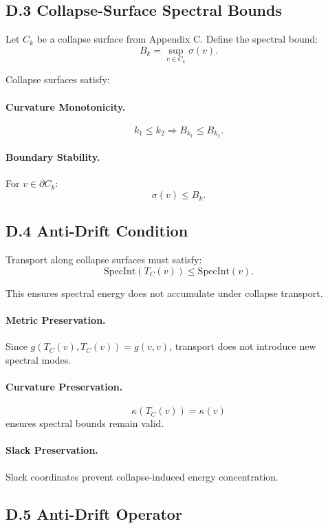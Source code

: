 \subsection{D.3 Collapse-Surface Spectral Bounds}

Let $C_k$ be a collapse surface from Appendix C. Define the spectral bound:
\[
B_k = \sup_{v \in C_k} \sigma(v).
\]

Collapse surfaces satisfy:

\paragraph{Curvature Monotonicity.}
\[
k_1 \le k_2 \Rightarrow B_{k_1} \le B_{k_2}.
\]

\paragraph{Boundary Stability.}
For $v \in \partial C_k$:
\[
\sigma(v) \le B_k.
\]

\subsection{D.4 Anti-Drift Condition}

Transport along collapse surfaces must satisfy:
\[
\mathrm{SpecInt}(T_C(v)) \le \mathrm{SpecInt}(v).
\]

This ensures spectral energy does not accumulate under collapse transport.

\paragraph{Metric Preservation.}
Since $g(T_C(v), T_C(v)) = g(v,v)$, transport does not introduce new spectral
modes.

\paragraph{Curvature Preservation.}
\[
\kappa(T_C(v)) = \kappa(v)
\]
ensures spectral bounds remain valid.

\paragraph{Slack Preservation.}
Slack coordinates prevent collapse-induced energy concentration.

\subsection{D.5 Anti-Drift Operator}

